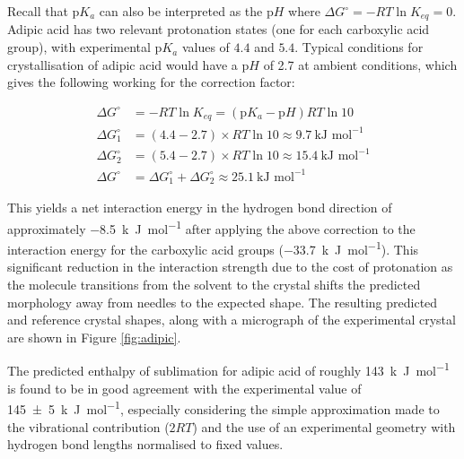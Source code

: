 \documentclass[twoside,twocolumn,9pt]{article}
\begin{document}
Recall that $\text{p}K_a$ can also be interpreted as the $\text{p}H$ where $\Delta G^{\circ} = -RT \ln {K_{eq}} = 0$.
Adipic acid has two relevant protonation states (one for each carboxylic acid group), with experimental $\text{p}K_a$ values of $4.4$ and $5.4$. Typical conditions for crystallisation of adipic acid would have a $\text{p}H$ of 2.7 at ambient conditions, which gives the following working for the correction factor:

\begin{align}
    \Delta G^{\circ} &= -R T \ln{K_{eq}} = (\text{p}K_a - \text{p}H) R T \ln{10}\\
    \Delta G^{\circ}_1 &= (4.4 - 2.7) \times R T \ln{10} \approx 9.7\ \text{kJ mol}^{-1}\\
    \Delta G^{\circ}_2 &= (5.4 - 2.7) \times R T \ln{10} \approx 15.4\ \text{kJ mol}^{-1}\\
    \Delta G^{\circ} &= \Delta G^{\circ}_1 + \Delta G^{\circ}_2 \approx 25.1\ \text{kJ mol}^{-1}
\end{align}

This yields a net interaction energy in the hydrogen bond direction of approximately \qty{-8.5}{k.J.mol^{-1}} after applying the above correction to the interaction energy for the carboxylic acid groups (\qty{-33.7}{k.J.mol^{-1}}). 
This significant reduction in the interaction strength due to the cost of protonation as the molecule transitions from the solvent to the crystal shifts the predicted morphology away from needles to the expected shape. The resulting predicted and reference crystal shapes, along with a micrograph of the experimental crystal are shown in Figure \ref{fig:adipic}.

The predicted enthalpy of sublimation for adipic acid of roughly \qty{143}{k.J.mol^{-1}} is found to be in good agreement with the experimental value of \qty{145 \pm 5}{k.J.mol^{-1}},\cite{Cappa2007} especially considering the simple approximation made to the vibrational contribution ($2 RT$) and the use of an experimental geometry 
with hydrogen bond lengths normalised to fixed values.
\end{document}

